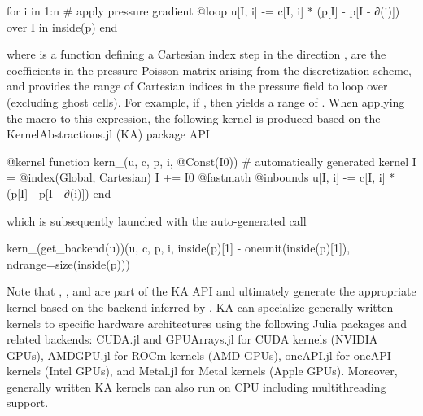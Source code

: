 \documentclass[10pt,a4paper]{article}
\begin{document}
\begin{minipage}{\linewidth}
\begin{jllisting}
for i in 1:n  # apply pressure gradient
    @loop u[I, i] -= c[I, i] * (p[I] - p[I - ∂(i)]) over I in inside(p)
end
\end{jllisting}
\end{minipage}

where  is a function defining a Cartesian index step in the direction ,  are the coefficients in the pressure-Poisson matrix arising from the discretization scheme, and  provides the range of Cartesian indices  in the pressure field to loop over (excluding ghost cells). For example, if , then  yields a range of . When applying the  macro to this expression, the following kernel is produced based on the KernelAbstractions.jl (KA) package API \citep{Churavy2023}

\begin{minipage}{\linewidth}
\begin{jllisting}
@kernel function kern_(u, c, p, i, @Const(I0)) # automatically generated kernel
    I = @index(Global, Cartesian)
    I += I0
    @fastmath @inbounds u[I, i] -= c[I, i] * (p[I] - p[I - ∂(i)])
end
\end{jllisting}
\end{minipage}

which is subsequently launched with the auto-generated call

\begin{minipage}{\linewidth}
\begin{jllisting}
kern_(get_backend(u))(u, c, p, i, inside(p)[1] - oneunit(inside(p)[1]), ndrange=size(inside(p)))
\end{jllisting}
\end{minipage}

Note that , ,  and  are part of the KA API and ultimately generate the appropriate kernel based on the backend inferred by . KA can specialize generally written kernels to specific hardware architectures using the following Julia packages and related backends: CUDA.jl and GPUArrays.jl \citep{Besard2018,Besard2019} for CUDA kernels (NVIDIA GPUs), AMDGPU.jl \citep{Samaroo2025} for ROCm kernels (AMD GPUs), oneAPI.jl \citep{Besard2022opeAPI} for oneAPI kernels (Intel GPUs), and Metal.jl \citep{Besard2022Metal} for Metal kernels (Apple GPUs). Moreover, generally written KA kernels can also run on CPU including multithreading support.
\end{document}
